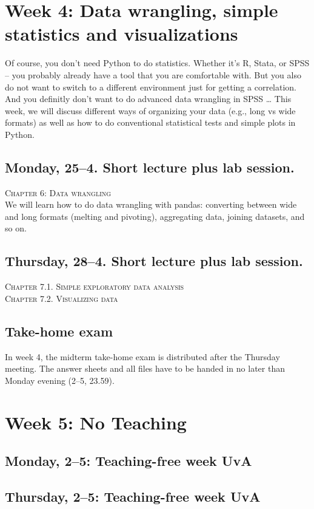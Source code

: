 \section*{Week 4: Data wrangling, simple statistics and visualizations}
Of course, you don't need Python to do statistics. Whether it's R, Stata, or SPSS -- you probably already have a tool that you are comfortable with. But you also do not want to switch to a different environment just for getting a correlation. And you definitly don't want to do advanced data wrangling in SPSS \ldots
This week, we will discuss different ways of organizing your data (e.g., long vs wide formats) as well as how to do conventional statistical tests and simple plots in Python.

\subsection*{Monday, 25--4. Short lecture plus lab session.}
\textsc{ Chapter 6: Data wrangling}\\
We will learn how to do data wrangling with pandas: converting between wide and long formats (melting and pivoting), aggregating data, joining datasets, and so on.

\subsection*{Thursday, 28--4.  Short lecture plus lab session.}
\textsc{ Chapter 7.1. Simple exploratory data analysis}\\
\textsc{ Chapter 7.2. Visualizing data}\\


\subsection*{Take-home exam}
In week 4, the midterm take-home exam is distributed after the Thursday meeting. The answer sheets and all files have to be handed in no later than Monday evening (2--5, 23.59).

\section*{Week 5: No Teaching}
\subsection*{Monday, 2--5: Teaching-free week UvA}
\subsection*{Thursday, 2--5: Teaching-free week UvA}


